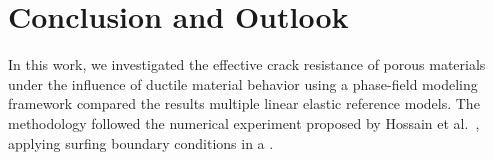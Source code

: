 \documentclass[pdflatex,sn-mathphys-num]{sn-jnl}%
\newcommand{\vMLabel}{[\textbf{vM}]\xspace}
\theoremstyle{thmstyleone}%
\theoremstyle{thmstyletwo}%
\theoremstyle{thmstylethree}%
\begin{document}




\section{Conclusion and Outlook}

In this work, we investigated the effective crack resistance of porous materials under the
influence of ductile material behavior using a phase-field modeling framework
compared the results  multiple linear elastic reference models. The methodology followed
the numerical experiment proposed by Hossain et al.~\cite{hossain_effective_2014}, applying
surfing boundary conditions  in a .
\end{document}
